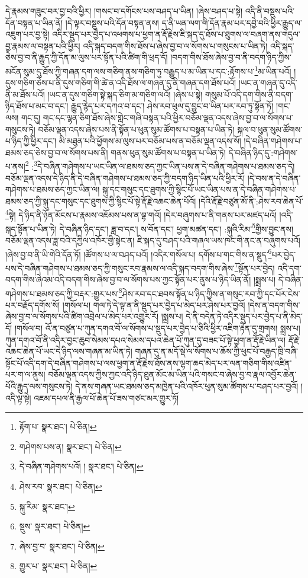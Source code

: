 དེ་རྣམས་གཟུང་བར་བྱ་བའི་ཕྱིར། །གསང་བ་དགོངས་པས་བཤད་པ་ཡིན། །ཞེས་བཤད་པ་སྟེ། འདི་ནི་བསྡུས་པའི་དོན་བསྟན་པ་ཡིན་ནོ། །དེ་ལྟར་བསྡུས་པའི་དོན་བསྟན་ནས། ད་ནི་ཡན་ལག་གི་དོན་རྣམ་པར་དབྱེ་བའི་ཕྱིར་རྒྱུད་ལ་འཇུག་པར་བྱ་སྟེ། འདིར་སྡུད་པར་བྱེད་པ་འཕགས་པ་ཕྱག་ན་རྡོ་རྗེས་ཇི་སྐད་དུ་ཐོས་པ་ཐུགས་ལ་བཞག་ནས་གདུལ་བྱ་རྣམས་ལ་བསྟན་པའི་ཕྱིར། འདི་སྐད་བདག་གིས་ཐོས་པ་ཞེས་བྱ་བ་ལ་སོགས་པ་གསུངས་པ་ཡིན་ཏེ། འདི་སྐད་ཅེས་བྱ་བ་ནི་རྒྱུད་ཀྱི་དོན་མ་ལུས་པར་སྟོན་པའི་ཚིག་གི་ཕྲད་དོ། །བདག་གིས་ཐོས་ཞེས་བྱ་བ་ནི་བདག་ཉིད་ཀྱིས་མངོན་སུམ་དུ་ཐོས་ཀྱི་གཞན་དག་ལས་གཅིག་ནས་གཅིག་ཏུ་བརྒྱུད་པ་མ་ཡིན་པ་དང་:རྟོགས་པ་\footnote{རྟོག་པ་  སྣར་ཐང་།  པེ་ཅིན། }མ་ཡིན་པའོ། །དུས་གཅིག་ཅེས་པ་ནི་དུས་གཅིག་གི་ཚེ་ན་འདི་ཐོས་ལ་གཞན་དུ་ནི་གཞན་དག་ཐོས་པའོ། །ཡང་ན་གཞན་དུ་འདི་ནི་མ་ཐོས་པའོ། །ཡང་ན་དུས་གཅིག་སྟེ་སྐད་ཅིག་མ་གཅིག་ལའོ། །ཞེས་པ་སྟེ། གསུམ་པོ་འདི་དག་གིས་ནི་བདག་ཉིད་ཐོས་པ་མང་བ་དང་། རྒྱུད་རྙེད་པར་དཀའ་བ་དང་། ཤེས་རབ་ཕུལ་དུ་བྱུང་བ་ཡིན་པར་རབ་ཏུ་སྟོན་ཏོ། །གང་ལས། གང་དུ། གང་དང་ལྷན་ཅིག་ཐོས་ཞེས་གླེང་གཞི་བསྟན་པའི་ཕྱིར་བཅོམ་ལྡན་འདས་ཞེས་བྱ་བ་ལ་སོགས་པ་གསུངས་ཏེ། བཅོམ་ལྡན་འདས་ཞེས་པས་ནི་སྟོན་པ་ཕུན་སུམ་ཚོགས་པ་བསྟན་པ་ཡིན་ཏེ། སྐལ་བ་ཕུན་སུམ་ཚོགས་པ་ཉིད་ཀྱི་ཕྱིར་དང་། མི་མཐུན་པའི་ཕྱོགས་མ་ལུས་པར་བཅོམ་པས་ན་བཅོམ་ལྡན་འདས་སོ། །དེ་བཞིན་གཤེགས་པ་ཐམས་ཅད་ཅེས་བྱ་བ་ལ་སོགས་པས་ནི། གནས་ཕུན་སུམ་ཚོགས་པ་བསྟན་པ་ཡིན་ཏེ། དེ་བཞིན་ཉིད་དུ་:གཤེགས་པ་ནས།\footnote{གཤེགས་པས་ན།  སྣར་ཐང་།  པེ་ཅིན། } :\footnote{དེ་བཞིན་གཤེགས་པའོ། །  སྣར་ཐང་།  པེ་ཅིན། }དེ་བཞིན་གཤེགས་པ་ཡང་ཡིན་ལ་ཐམས་ཅད་ཀྱང་ཡིན་པས་ན་དེ་བཞིན་གཤེགས་པ་ཐམས་ཅད་དེ། བཅོམ་ལྡན་འདས་དེ་ཉིད་ནི་དེ་བཞིན་གཤེགས་པ་ཐམས་ཅད་ཀྱི་བདག་ཉིད་ཡིན་པའི་ཕྱིར་རོ། །དེ་བས་ན་དེ་བཞིན་གཤེགས་པ་ཐམས་ཅད་ཀྱང་ཡིན་ལ། སྐུ་དང་གསུང་དང་ཐུགས་ཀྱི་སྙིང་པོ་ཡང་ཡིན་པས་ན་དེ་བཞིན་གཤེགས་པ་ཐམས་ཅད་ཀྱི་སྐུ་དང་གསུང་དང་ཐུགས་ཀྱི་སྙིང་པོ་སྟེ་རྡོ་རྗེ་འཆང་ཆེན་པོའོ། །དེའི་རྡོ་རྗེ་བཙུན་མོ་ནི་:ཤེས་རབ་ཆེན་པོ་\footnote{ཤེས་རབ་  སྣར་ཐང་།  པེ་ཅིན། }སྟེ། དེ་ཉིད་ནི་ཉོན་མོངས་པ་རྣམས་འཇོམས་པས་ན་བྷ་གའོ། །དེར་བཞུགས་པ་ནི་གནས་པར་མཛད་པའོ། །འདི་སྐད་སྟོན་པ་ཡིན་ཏེ། དེ་བཞིན་ཉིད་དང་། ཟླ་བ་དང་། ས་བོན་དང་། ཕྱག་མཚན་དང་། :སྐུའི་རིམ་\footnote{སྐུ་རིམ་  སྣར་ཐང་། }གྱིས་བྱུང་ནས། བཅོམ་ལྡན་འདས་ཟླ་བའི་དཀྱིལ་འཁོར་གྱི་སྟེང་ན། ཇི་སྐད་དུ་བཤད་པའི་གཞལ་ཡས་ཁང་གི་ནང་ན་བཞུགས་པའོ། །ཞེས་བྱ་བ་ནི་ཡི་གེའི་དོན་ཏོ། །ཚོགས་པ་ལ་བཤད་པའོ། །འདིར་གསོལ་པ། དགོས་པ་གང་གིས་ན་སྡུད་\footnote{སྡུས་  སྣར་ཐང་།  པེ་ཅིན། }པར་བྱེད་པས་དེ་བཞིན་གཤེགས་པ་ཐམས་ཅད་ཀྱི་གསུང་རབ་རྣམས་ལ་འདི་སྐད་བདག་གིས་ཞེས་\footnote{ཞེས་བྱ་བ་  སྣར་ཐང་།  པེ་ཅིན། }སྟོན་པར་བྱེད། འདི་དག་བདག་གིས་ཞེའམ་འདི་བདག་གིས་ཞེས་བྱ་བ་ལ་སོགས་པས་ཀྱང་སྟོན་པར་ནུས་པ་ཉིད་ཡིན་ནོ། །སྨྲས་པ། དེ་བཞིན་གཤེགས་པ་ཐམས་ཅད་ཀྱི་བརྡར་:གྱུར་པས་\footnote{གྱུར་པ་  སྣར་ཐང་།  པེ་ཅིན། }ཤེས་རབ་དང་ཐབས་སྟོན་པ་ཉིད་ཀྱིས་ན་གསུང་རབ་ཀྱི་དང་པོར་ངེས་པར་བརྗོད་དགོས་སོ། །གསོལ་པ། གལ་ཏེ་དེ་ལྟ་ན་ནི་སྡུད་པར་བྱེད་པ་མེད་པར་ཤེས་པར་བྱའོ། །དེས་ན་བདག་གིས་ཞེས་བྱ་བ་ལ་སོགས་པའི་ཚིག་འབྲེལ་པ་མེད་པར་འགྱུར་རོ། །སྨྲས་པ། དེ་ནི་བདེན་ཏེ་འདིར་སྡུད་པར་བྱེད་པ་ནི་མེད་དོ། །གསོལ་བ། འོ་ན་བཙུན་པ་ཀུན་དགའ་བོ་ལ་སོགས་པ་སྡུད་པར་བྱེད་པ་ཅིའི་ཕྱིར་འཇིག་རྟེན་དུ་གྲགས། སྨྲས་པ། ཀུན་དགའ་བོ་ནི་འདིར་བྱང་ཆུབ་སེམས་དཔའ་སེམས་དཔའ་ཆེན་པོ་ཀུན་དུ་བཟང་པོ་སྟེ་ཕྱག་ན་རྡོ་རྗེ་ཡིན་ལ། རྡོ་རྗེ་འཆང་ཆེན་པོ་ཡང་དེ་ཉིད་ལས་གཞན་མ་ཡིན་ཏེ། གཞན་དུ་ན་མདོ་སྡེ་ལ་སོགས་པ་ཆོས་ཀྱི་ཕུང་པོ་བརྒྱད་ཁྲི་བཞི་སྟོང་པོ་འདི་དག་དེ་བཞིན་གཤེགས་པ་ལས་ཕྱག་ན་རྡོ་རྗེས་ཐོས་ནས་ལྷག་ཆད་མེད་པར་ལན་གཅིག་གིས་འཛིན་པར་ག་ལ་ནུས། བཅོམ་ལྡན་འདས་ཀྱིས་ཀྱང་འདི་ཉིད་ཐུན་མོང་མ་ཡིན་པའི་གསང་བ་ཞེས་བྱ་བ་རྣལ་འབྱོར་ཆེན་པོའི་རྒྱུད་ལས་གསུངས་ཏེ། དེ་ནས་གཞན་ཡང་ཐམས་ཅད་མཁྱེན་པའི་འཁོར་ཕུན་སུམ་ཚོགས་པ་བཤད་པར་བྱའོ། །འདི་ལྟ་སྟེ། འཇམ་དཔལ་ནི་རྒྱལ་པོ་ཆེན་པོ་ཟས་གཙང་མར་གྱུར་ཏོ། 